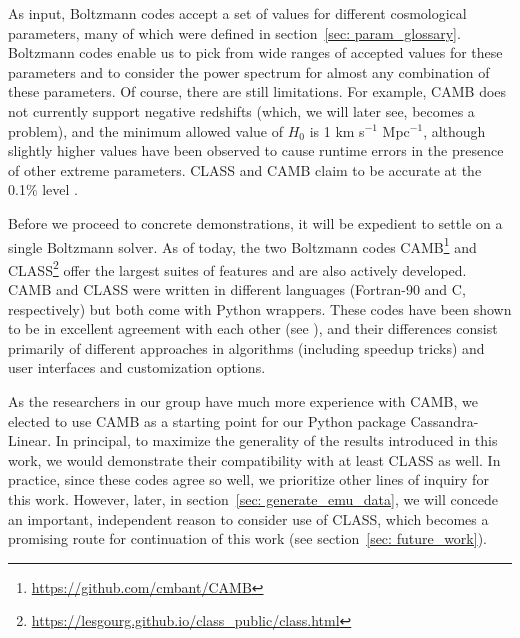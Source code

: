 
As input, Boltzmann codes accept a set of values for different 
cosmological parameters, many of which were defined in section~\ref{sec: 
param_glossary}. Boltzmann codes enable us to pick from wide ranges of 
accepted values for these parameters and to consider the power 
spectrum for almost any combination of these parameters. Of course, there are 
still limitations. For example, CAMB does not currently support negative 
redshifts (which, we will later see, becomes a problem), and the minimum 
allowed value of $H_0$ is 1 km s$^{-1}$ Mpc$^{-1}$, although slightly higher 
values have 
been observed to cause runtime errors in the presence of other extreme 
parameters. CLASS and CAMB claim to be accurate at the 0.1\% level
.


Before we proceed to concrete demonstrations, it will be expedient to settle
on a single Boltzmann solver. As of today, the two Boltzmann codes
CAMB\footnote{\url{https://github.com/cmbant/CAMB}} and
CLASS\footnote{\url{https://lesgourg.github.io/class_public/class.html}} offer
the largest suites of features and are also actively developed. CAMB and
CLASS were written in different languages (Fortran-90 and C, respectively)
but both come with Python wrappers. These codes have been shown to be in 
excellent agreement with each other (see ), and their
differences consist primarily of different approaches in algorithms (including 
speedup tricks) and user interfaces and customization options.

As the researchers in our group have much more experience with CAMB, we 
elected to use CAMB as a starting point for our Python package
Cassandra-Linear. In principal, to maximize the generality of 
the results introduced in this 
work, we would demonstrate their compatibility with at least CLASS as well. In 
practice, since these codes agree so well, we prioritize other lines of 
inquiry
for this work. However, later, in section~\ref{sec: generate_emu_data}, we 
will concede an important, 
independent reason to consider use of CLASS, which becomes a promising route
for continuation of this work (see section~\ref{sec: future_work}).

\begin{comment}
\textcolor{green}{Furthermore, the CLASS documentation
is not nearly as strong as it is with CAMB, and we already encountered
extreme difficulty simply in recreating results already previously obtained
via CAMB!}
\end{comment}

